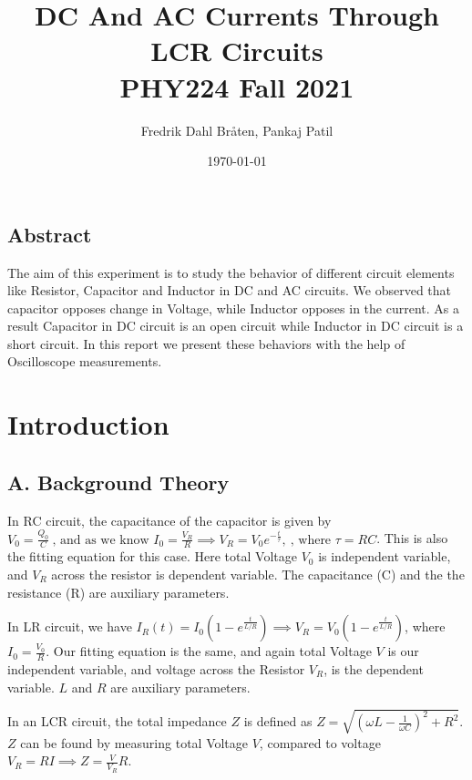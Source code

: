 \documentclass[a4paper,12pt]{article}
\begin{document}
\title{DC And AC Currents Through LCR Circuits \\
\large PHY224 Fall 2021}
\author{Fredrik Dahl Bråten, Pankaj Patil}
\date{\today}
\maketitle
\begin{center}
	\section*{Abstract}
\end{center}
The aim of this experiment is  to study the behavior of different  circuit elements like 
Resistor, Capacitor and Inductor in DC and AC circuits. We observed that capacitor opposes
change in Voltage, while Inductor opposes in the current. As a result Capacitor in DC circuit is an open
circuit while Inductor in DC circuit is a short circuit. In this report we present 
these behaviors with the help of Oscilloscope measurements.

\section{Introduction}

\subsection*{A. Background Theory}
In RC circuit, the capacitance of the capacitor is given by $V_0 = \frac{Q_0}{C} \ \text{, and as we know  } I_0 = \frac{V_R}{R} \implies V_R = V_0e^{-\frac{t}{\tau}},\ \text{, where } \tau = RC$. This is also 
the fitting equation for this case. Here total Voltage $V_0$ is independent variable, and $V_R$ across the resistor is dependent variable. The capacitance (C) and the the resistance (R) are 
auxiliary parameters.

In LR circuit, we have $I_R(t) = I_0(1-e^{\frac{t}{L/R}}) \implies V_R =  V_0(1-e^{\frac{t}{L/R}})$, where $I_0  = \frac{V_0}{R}$. Our fitting equation is the same, and again total Voltage $V$ is our 
independent variable, and voltage across the Resistor $V_R$, is the dependent variable. $L$ and $R$ are auxiliary parameters.

In an LCR circuit, the total impedance $Z$ is defined as $Z = \sqrt{(\omega L - \frac{1}{\omega C})^2 + R^2}$. $Z$ can be found by measuring 
total Voltage $V$, compared to voltage $V_R = RI \implies Z = \frac{V}{V_R}R$.
\end{document}

